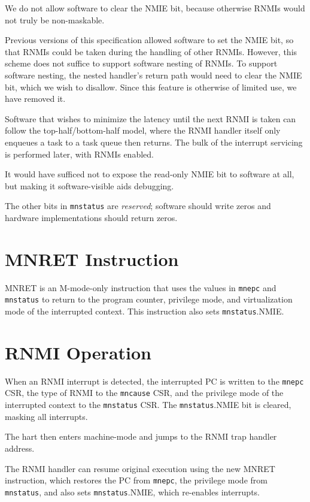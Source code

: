 \begin{commentary}
We do not allow software to clear the NMIE bit, because otherwise RNMIs
would not truly be non-maskable.

Previous versions of this specification allowed software to set the NMIE bit,
so that RNMIs could be taken during the handling of other RNMIs.
However, this scheme does not suffice to support software nesting of RNMIs.
To support software nesting, the nested handler's return path would need to
clear the NMIE bit, which we wish to disallow.
Since this feature is otherwise of limited use, we have removed it.

Software that wishes to minimize the latency until the next RNMI is taken can
follow the top-half/bottom-half model, where the RNMI handler itself only
enqueues a task to a task queue then returns.
The bulk of the interrupt servicing is performed later, with RNMIs enabled.

It would have sufficed not to expose the read-only NMIE bit to software at
all, but making it software-visible aids debugging.
\end{commentary}

The other
bits in {\tt mnstatus} are {\em reserved}; software should write zeros and
hardware implementations should return zeros.

\section{MNRET Instruction}

MNRET is an M-mode-only instruction that uses the values in {\tt mnepc} and
{\tt mnstatus} to return to the program counter, privilege mode,
and virtualization mode of the interrupted context.
This instruction also sets {\tt mnstatus}.NMIE.

\section{RNMI Operation}

When an RNMI interrupt is detected, the interrupted PC is written to
the {\tt mnepc} CSR, the type of RNMI to the {\tt mncause} CSR, and the
privilege mode of the interrupted context to the {\tt mnstatus} CSR.
The {\tt mnstatus}.NMIE bit is cleared, masking all interrupts.

The hart then enters machine-mode and jumps to the RNMI trap handler
address.

The RNMI handler can resume original execution using the new MNRET
instruction, which restores the PC from {\tt mnepc}, the privilege mode
from {\tt mnstatus}, and also sets {\tt mnstatus}.NMIE, which
re-enables interrupts.

